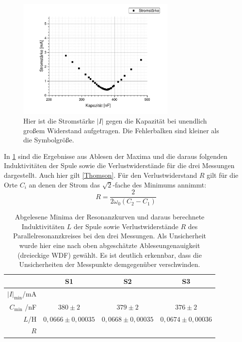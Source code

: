 \documentclass[
	a4paper,
	12pt,
	pagesize,
	ngerman
]{scrartcl}
\begin{document}
	\begin{figure}[H]
		\includegraphics[width=0.7\textwidth]{Parallelstromkreis_inf}
		\centering
		\caption{Hier ist die Stromstärke $ \left| I \right| $ gegen die Kapazität bei unendlich großem Widerstand aufgetragen. Die Fehlerbalken sind kleiner als die Symbolgröße.}
		\label{Para_inf}
		\centering
	\end{figure}
	
	In \cref{Para_Erg} sind die Ergebnisse aus Ablesen der Maxima und die daraus folgenden Induktivitäten der Spule sowie die Verlustwiderstände für die drei Messungen dargestellt.
	Auch hier gilt \cref{Thomson}.
	Für den Verlustwiderstand $R$ gilt für die Orte $C_i$ an denen der Strom das $ \sqrt{2} $-fache des Minimums annimmt:
	\begin{equation}
	R= \frac{2}{2\omega_0 \left( C_2 - C_1 \right)}
	\end{equation}
	
	\begin{table}[tb]
		\centering
		\begin{tabular}{ r | c | c | c }
			&S1 & S2 & S3 \\ \hline
			$  \left| I \right|_\text{min}$/\si{mA} & & & \\ 
			$C_\text{min}$ /\si{nF} &$380\pm2$&$379\pm2$&$376\pm2$\\
			$L$/\si{\henry} & $0,0666\pm 0,00035$ & $0,0668 \pm 0,00035$ & $0,0674\pm 0,00036$\\
			$R$ & & & \\
		\end{tabular}
		\caption{Abgelesene Minima der Resonanzkurven und daraus berechnete Induktivitäten $L$ der Spule sowie Verlustwiderstände $R$ des Parallelresonanzkreises bei den drei Messungen. Als Unsicherheit wurde hier eine nach oben abgeschätzte Ableseungenauigkeit (dreieckige WDF) gewählt. Es ist deutlich erkennbar, dass die Unsicherheiten der Messpunkte demgegenüber verschwinden.}
		\label{Para_Erg} 
	\end{table}
\end{document}
